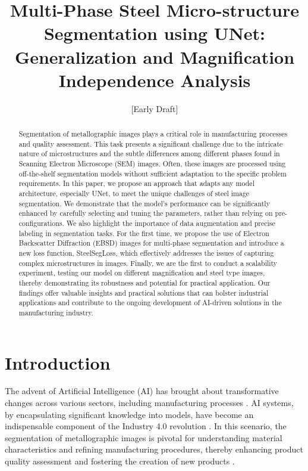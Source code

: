 \documentclass[]{article}
\title{Multi-Phase Steel Micro-structure Segmentation using UNet: Generalization and Magnification Independence Analysis}
\author{[Early Draft]}
\begin{document}
\maketitle

\begin{abstract}
	
Segmentation of metallographic images plays a critical role in manufacturing processes and quality assessment. This task presents a significant challenge due to the intricate nature of microstructures and the subtle differences among different phases found in Scanning Electron Microscope (SEM) images. Often, these images are processed using off-the-shelf segmentation models without sufficient adaptation to the specific problem requirements. In this paper, we propose an approach that adapts any model architecture, especially UNet,  to meet the unique challenges of steel image segmentation. We demonstrate that the model's performance can be significantly enhanced by carefully selecting and tuning the parameters, rather than relying on pre-configurations. We also highlight the importance of data augmentation and precise labeling in segmentation tasks. For the first time, we propose the use of Electron Backscatter Diffraction (EBSD) images for multi-phase segmentation and introduce a new loss function, SteelSegLoss, which effectively addresses the issues of capturing complex microstructures in images. Finally, we are the first to conduct a scalability experiment, testing our model on different magnification and steel type images, thereby demonstrating its robustness and potential for practical application. Our findings offer valuable insights and practical solutions that can bolster industrial applications and contribute to the ongoing development of AI-driven solutions in the manufacturing industry.

\end{abstract}

\section{Introduction}

The advent of Artificial Intelligence (AI) has brought about transformative changes across various sectors, including manufacturing processes \cite{russel2010}. AI systems, by encapsulating significant knowledge into models, have become an indispensable component of the Industry 4.0 revolution \cite{lasi2014industry}. In this scenario, the segmentation of metallographic images is pivotal for understanding material characteristics and refining manufacturing procedures, thereby enhancing product quality assessment and fostering the creation of new products \cite{gonzalez2008digital, cv_algandapp}.
\end{document}
